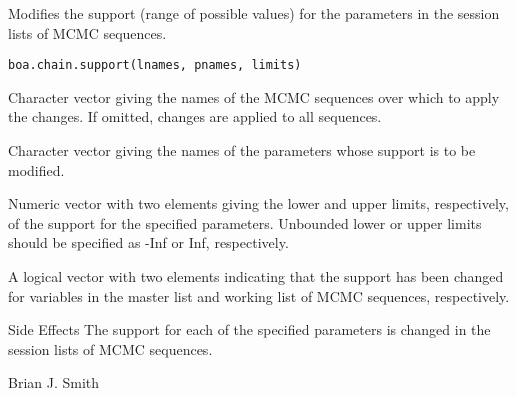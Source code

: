 \begin{Description}\relax
Modifies the support (range of possible values) for the parameters in the
session lists of MCMC sequences.
\end{Description}
\begin{Usage}
\begin{verbatim}
boa.chain.support(lnames, pnames, limits)
\end{verbatim}
\end{Usage}
\begin{Arguments}
\begin{ldescription}
\item[\code{lnames}] Character vector giving the names of the MCMC sequences over
which to apply the changes. If omitted, changes are applied to all sequences.
\item[\code{pnames}] Character vector giving the names of the parameters whose
support is to be modified.
\item[\code{limits}] Numeric vector with two elements giving the lower and upper
limits, respectively, of the support for the specified parameters. Unbounded
lower or upper limits should be specified as -Inf or Inf, respectively.
\end{ldescription}
\end{Arguments}
\begin{Value}
A logical vector with two elements indicating that the support has been
changed for variables in the master list and working list of MCMC sequences,
respectively.
\end{Value}
\begin{Section}{Side Effects}
The support for each of the specified parameters is changed in the session
lists of MCMC sequences.
\end{Section}
\begin{Author}\relax
Brian J. Smith
\end{Author}

